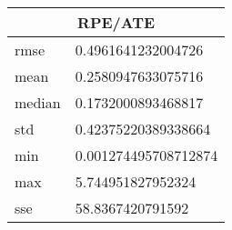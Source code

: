 \begin{table}[!ht] 
 \centering 
 \begin{tabular}{|l|l|} \hline 
 \multicolumn{2}{|c|}{RPE/ATE} \\ \hline 
 rmse & 0.4961641232004726 \\ \hline 
mean & 0.2580947633075716 \\ \hline 
median & 0.1732000893468817 \\ \hline 
std & 0.42375220389338664 \\ \hline 
min & 0.001274495708712874 \\ \hline 
max & 5.744951827952324 \\ \hline 
sse & 58.8367420791592 \\ \hline 
\end{tabular} 
 \end{table}
